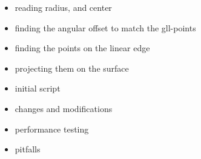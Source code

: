 \begin{itemize}
		\item reading radius, and center
		\item finding the angular offset to match the gll-points
		\item finding the points on the linear edge
		\item projecting them on the surface
\end{itemize}
\begin{itemize}
	\item initial script
	\item changes and modifications
	\item performance testing
	\item pitfalls
\end{itemize}
